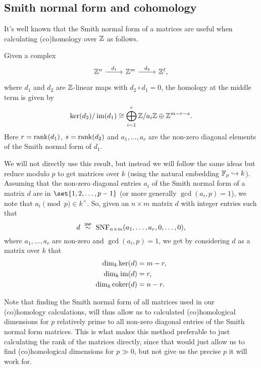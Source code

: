 \subsection{Smith normal form and cohomology}%
\label{subsec:SNF-coh}

It's well known that the Smith normal form of a matrices are useful when calculating (co)homology over $\mathbb{Z}$ as follows.

\begin{fact}\label{fact:SNF-Z-coh}
  Given a complex
  \[
    \begin{tikzcd}
      \Z^{n} \ar[r,"d_{1}"] & \Z^{m} \ar[r,"d_{2}"] & \Z^{\ell},
    \end{tikzcd}
  \]
  where $d_{1}$ and $d_{2}$ are $\mathbb{Z}$-linear maps with $d_{2} \circ d_{1} = 0$, the homology at the middle term is given by
  \begin{equation*}
    \operatorname{ker}(d_{2})/\operatorname{im}(d_{1}) \cong \bigoplus_{i=1}^{r} \mathbb{Z}/a_{i}\mathbb{Z} \oplus \mathbb{Z}^{m-r-s}.
  \end{equation*}
  Here $r = \operatorname{rank}(d_{1})$, $s = \operatorname{rank}(d_{2})$ and $a_{1},\dotsc,a_{r}$ are the non-zero diagonal elements of the Smith normal form of $d_{1}$.
\end{fact}

We will not directly use this result, but instead we will follow the same ideas but reduce modulo $p$ to get matrices over $k$ (using the natural embedding $\mathbb{F}_{p} \hookrightarrow k$). Assuming that the non-zero diagonal entries $a_{i}$ of the Smith normal form of a matrix $d$ are in $\set{1,2,\dotsc,p-1}$ (or more generally $\gcd(a_{i},p) = 1$), we note that $a_{i} \pmod{p} \in k^{\times}$. So, given an $n \times m$ matrix $d$ with integer entries such that
\begin{equation*}
  d \snfsim \SNF_{n \times m}(a_{1},\dotsc,a_{r},0,\dotsc,0),
\end{equation*}
where $a_{1},\dotsc,a_{r}$ are non-zero and $\gcd(a_{i},p) = 1$, we get by considering $d$ as a matrix over $k$ that
\begin{equation}
  \label{eq:snf-dims}
  \begin{aligned}
    \dim_{k} \operatorname{ker}(d) &= m-r, \\
    \dim_{k} \operatorname{im}(d) &= r, \\
    \dim_{k} \operatorname{coker}(d) &= n-r.
  \end{aligned}
\end{equation}

\begin{remark}
  Note that finding the Smith normal form of all matrices used in our (co)homology calculations, will thus allow us to calculated (co)homological dimensions for $p$ relatively prime to all non-zero diagonal entries of the Smith normal form matrices. This is what makes this method preferable to just calculating the rank of the matrices directly, since that would just allow us to find (co)homological dimensions for $p \gg 0$, but not give us the precise $p$ it will work for.
\end{remark}


